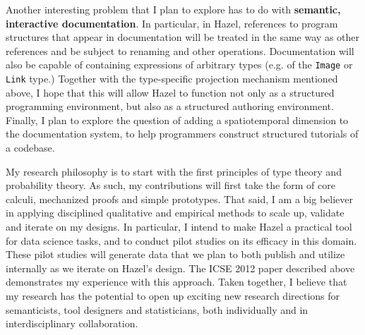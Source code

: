 \documentclass[9pt]{extarticle}
\let\li\lstinline
\begin{document}
Another interesting problem that I plan to explore has to do with \textbf{semantic, interactive documentation}. In particular, in Hazel, references to program structures that appear in documentation will be treated in the same way as other references and be subject to renaming and other operations. Documentation will also be capable of containing expressions of arbitrary types (e.g. of the \li{Image} or \li{Link} type.) Together with the type-specific projection mechanism mentioned above, I hope that this will allow Hazel to function not only as a structured programming environment, but also as a structured authoring environment. Finally, I plan to explore the question of adding a spatiotemporal dimension to the documentation system, to help programmers construct structured tutorials of a codebase.

My research philosophy is to start with the first principles of type theory and probability theory. As such, my contributions will first take the form of core calculi, mechanized proofs and simple prototypes. That said, I am a big believer in applying disciplined qualitative and empirical methods to scale up, validate and iterate on my designs. In particular, I intend to make Hazel a practical tool for data science tasks, and to conduct pilot studies on its efficacy in this domain. These pilot studies will generate data that we plan to both publish and utilize internally as we iterate on Hazel's design. The ICSE 2012 paper described above demonstrates my experience with this approach. Taken together, I believe that my research has the potential to open up exciting new research directions for semanticists, tool designers and statisticians, both individually and in interdisciplinary collaboration. 


 
\end{document}
